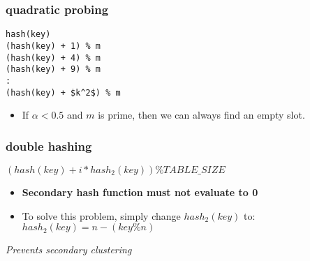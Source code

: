 \documentclass{article}
\begin{document}
\begin{multicols*}{3}
    \subsubsection{quadratic probing}
    \begin{lstlisting}[mathescape]
hash(key) 
(hash(key) + 1) % m
(hash(key) + 4) % m
(hash(key) + 9) % m
:
(hash(key) + $k^2$) % m
\end{lstlisting}
    \begin{itemize}
        \item If $\alpha < 0.5$ and $m$ is prime, then we can always
              find an empty slot.
    \end{itemize}
    \subsubsection{double hashing}
    $(hash(key) + i * hash_2(key)) \% TABLE\_SIZE$
    \begin{itemize}
        \item \textbf{Secondary hash function must not evaluate
                  to 0}
        \item To solve this problem, simply change $hash_2(key)$
              to: $hash_2(key) = n - (key \% n)$
    \end{itemize}
    \emph{Prevents secondary clustering}

\end{multicols*}
\end{document}
